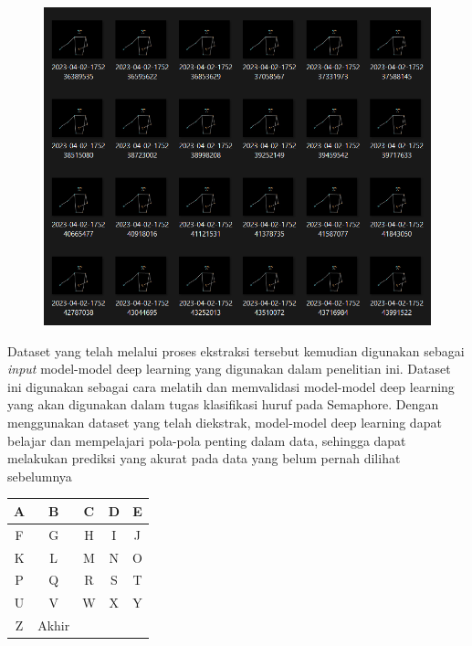\begin{figure}[!hbt]
	\centering
	\includegraphics[width=0.7\linewidth]{gambar/tugas-akhir-dawe.png}
	\label{fig:Datasetekstark}
\end{figure}

Dataset yang telah melalui proses ekstraksi tersebut kemudian digunakan sebagai \textit{input}  model-model deep learning yang digunakan dalam penelitian ini. Dataset ini digunakan sebagai cara melatih dan memvalidasi model-model deep learning yang akan digunakan dalam tugas klasifikasi huruf pada Semaphore. Dengan menggunakan dataset yang telah diekstrak, model-model deep learning dapat belajar dan mempelajari pola-pola penting dalam data, sehingga dapat melakukan prediksi yang akurat pada data yang belum pernah dilihat sebelumnya

\begin{table}[htbp]
	\centering
	\label{tab:datasetlabel}
	\begin{tabular}{|c|c|c|c|c|}
		\hline
		A & B & C & D & E \\
		\hline
		F & G & H & I & J \\
		\hline
		K & L & M & N & O \\
		\hline
		P & Q & R & S & T \\
		\hline
		U & V & W & X & Y \\
		\hline
		Z &   Akhir &   &   &   \\
		\hline
	\end{tabular}
\end{table}

